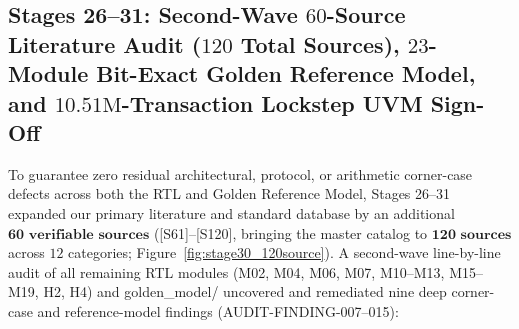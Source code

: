 \documentclass[10pt,journal,compsoc]{IEEEtran}
\def\texttt#1{#1}%
\begin{document}
\subsection{Stages 26--31: Second-Wave $60$-Source Literature Audit ($120$ Total Sources), $23$-Module Bit-Exact Golden Reference Model, and $10.51\text{M}$-Transaction Lockstep UVM Sign-Off}
To guarantee zero residual architectural, protocol, or arithmetic corner-case defects across both the RTL and Golden Reference Model, Stages 26--31 expanded our primary literature and standard database by an additional $\mathbf{60\text{ verifiable sources}}$ (\texttt{[S61]}--\texttt{[S120]}, bringing the master catalog to $\mathbf{120\text{ sources}}$ across $12$ categories; Figure~\ref{fig:stage30_120source}). A second-wave line-by-line audit of all remaining RTL modules (\texttt{M02}, \texttt{M04}, \texttt{M06}, \texttt{M07}, \texttt{M10}--\texttt{M13}, \texttt{M15}--\texttt{M19}, \texttt{H2}, \texttt{H4}) and \texttt{golden\_model/} uncovered and remediated nine deep corner-case and reference-model findings (\texttt{AUDIT-FINDING-007}--\texttt{015}):
\end{document}
